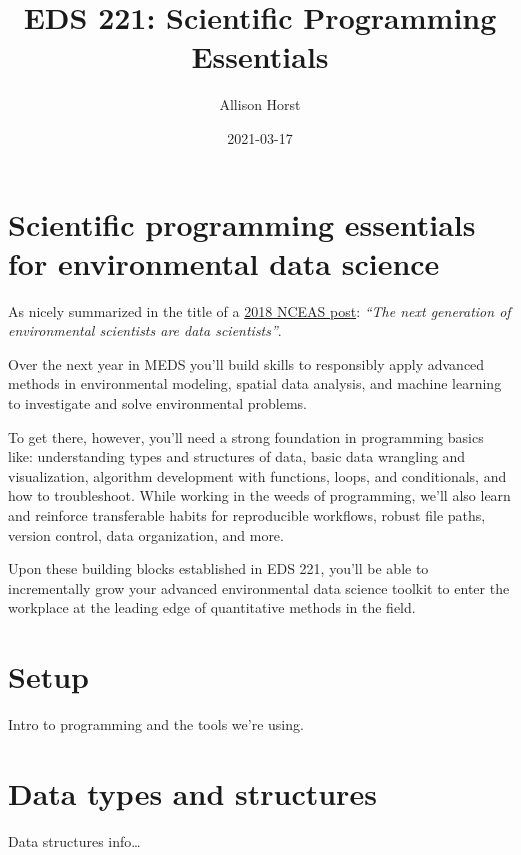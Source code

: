 \documentclass[
]{book}
\title{EDS 221: Scientific Programming Essentials}
\author{Allison Horst}
\date{2021-03-17}
\begin{document}
\maketitle

{
\setcounter{tocdepth}{1}
\tableofcontents
}
\hypertarget{scientific-programming-essentials-for-environmental-data-science}{%
\chapter{Scientific programming essentials for environmental data science}\label{scientific-programming-essentials-for-environmental-data-science}}

As nicely summarized in the title of a \href{https://www.nceas.ucsb.edu/news/next-generation-environmental-scientists-are-data-scientists}{2018 NCEAS post}: \emph{``The next generation of environmental scientists are data scientists''}.

Over the next year in MEDS you'll build skills to responsibly apply advanced methods in environmental modeling, spatial data analysis, and machine learning to investigate and solve environmental problems.

To get there, however, you'll need a strong foundation in programming basics like: understanding types and structures of data, basic data wrangling and visualization, algorithm development with functions, loops, and conditionals, and how to troubleshoot. While working in the weeds of programming, we'll also learn and reinforce transferable habits for reproducible workflows, robust file paths, version control, data organization, and more.

Upon these building blocks established in EDS 221, you'll be able to incrementally grow your advanced environmental data science toolkit to enter the workplace at the leading edge of quantitative methods in the field.

\hypertarget{setup}{%
\chapter{Setup}\label{setup}}

Intro to programming and the tools we're using.

\hypertarget{types}{%
\chapter{Data types and structures}\label{types}}

Data structures info\ldots{}
\end{document}
